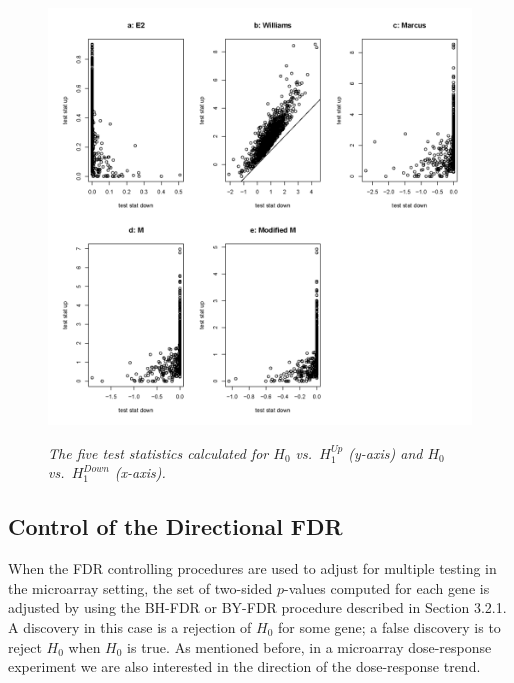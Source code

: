 \documentclass[10pt]{mybook4}
\begin{document}
\begin{figure}[!h]
\centering
{\includegraphics[width=1\textwidth]{stat1a.png}}
\caption{\em{The five test statistics calculated for $H_0$ vs.\
$H_1^{Up}$ (y-axis) and $H_0$ vs.\ $H_1^{Down}$ (x-axis).}}
\label{stat1}
\end{figure}








\subsection{Control of the Directional FDR}
\label{sec: FDR}

When the FDR controlling procedures are used to adjust for multiple
testing in the microarray setting, the set of two-sided $p$-values
computed for each gene is adjusted by using the BH-FDR or BY-FDR
procedure described in Section 3.2.1. A discovery in this case is a
rejection of $H_0$ for some gene; a false discovery is to reject
$H_0$ when $H_0$ is true. As mentioned before, in a microarray
dose-response experiment we are also interested in the direction of
the dose-response trend.
\end{document}
